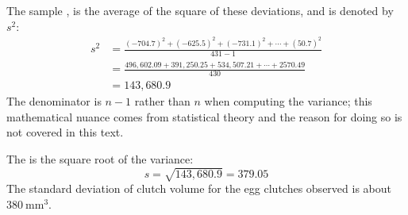 \begin{doublespace}
The sample \label{varianceFirstDiscussed}, is the average of the square of these deviations, and is  denoted by $s^2$:
\begin{align*}
s^2 &= \frac{(-704.7)^2 + (-625.5)^2 + (-731.1)^2 + \cdots + (50.7)^2}{431-1} \\
&= \frac{496,602.09 + 391,250.25 + 534,507.21 + \cdots + 2570.49}{430} \\
&= 143,680.9
\end{align*}
The denominator is $n-1$ rather than $n$ when computing the variance; this mathematical nuance comes from statistical theory and the reason for doing so is not covered in this text.

The  is the square root of the variance:
$$s=\sqrt{143,680.9} = 379.05$$
 The standard deviation of clutch volume for the egg clutches observed is about $380\ \textrm{mm}^{3}$. 

\end{doublespace}
